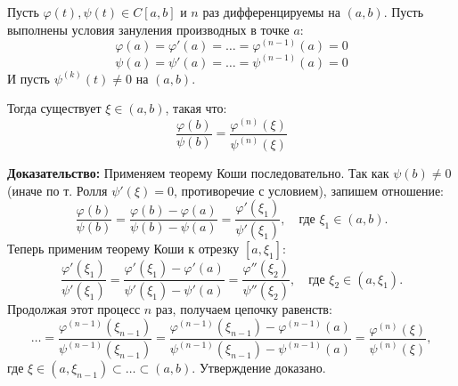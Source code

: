 \begin{tcolorbox}[title=Утверждение (Многократное применение теоремы Коши)]
    Пусть $\varphi(t), \psi(t) \in C[a, b]$ и $n$ раз дифференцируемы на $(a, b)$.
    Пусть выполнены условия зануления производных в точке $a$:
    \[ \varphi(a) = \varphi'(a) = \dots = \varphi^{(n-1)}(a) = 0 \]
    \[ \psi(a) = \psi'(a) = \dots = \psi^{(n-1)}(a) = 0 \]
    И пусть $\psi^{(k)}(t) \neq 0$ на $(a, b)$.
    
    Тогда существует $\xi \in (a, b)$, такая что:
    \[ \frac{\varphi(b)}{\psi(b)} = \frac{\varphi^{(n)}(\xi)}{\psi^{(n)}(\xi)} \]
\end{tcolorbox}

\textbf{Доказательство:}
Применяем теорему Коши последовательно.
Так как $\psi(b) \neq 0$ (иначе по т. Ролля $\psi'(\xi)=0$, противоречие с условием), запишем отношение:
\[ \frac{\varphi(b)}{\psi(b)} = \frac{\varphi(b) - \varphi(a)}{\psi(b) - \psi(a)} = \frac{\varphi'(\xi_1)}{\psi'(\xi_1)}, \quad \text{где } \xi_1 \in (a, b). \]
Теперь применим теорему Коши к отрезку $[a, \xi_1]$:
\[ \frac{\varphi'(\xi_1)}{\psi'(\xi_1)} = \frac{\varphi'(\xi_1) - \varphi'(a)}{\psi'(\xi_1) - \psi'(a)} = \frac{\varphi''(\xi_2)}{\psi''(\xi_2)}, \quad \text{где } \xi_2 \in (a, \xi_1). \]
Продолжая этот процесс $n$ раз, получаем цепочку равенств:
\[ \dots = \frac{\varphi^{(n-1)}(\xi_{n-1})}{\psi^{(n-1)}(\xi_{n-1})} = \frac{\varphi^{(n-1)}(\xi_{n-1}) - \varphi^{(n-1)}(a)}{\psi^{(n-1)}(\xi_{n-1}) - \psi^{(n-1)}(a)} = \frac{\varphi^{(n)}(\xi)}{\psi^{(n)}(\xi)}, \]
где $\xi \in (a, \xi_{n-1}) \subset \dots \subset (a, b)$.
Утверждение доказано.

